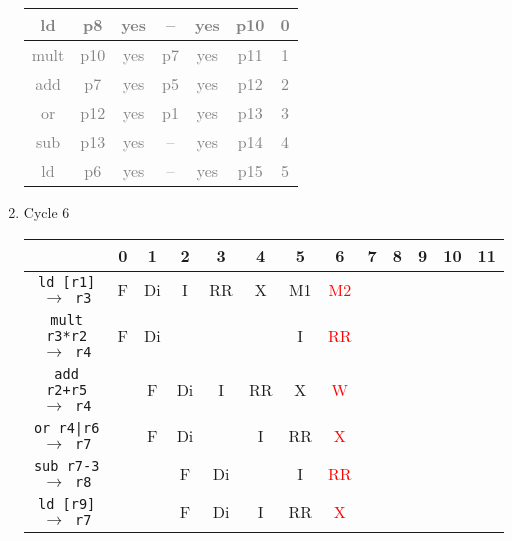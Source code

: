 \documentclass[12pt]{article}
\begin{document}
\begin{enumerate}
\begin{table}[H]
\begin{tabular}{|c|c|c|c|c|c|c|}
					\hline
					\textcolor{gray}{ld} & \textcolor{gray}{p8} & \textcolor{gray}{yes} & \textcolor{gray}{--} & \textcolor{gray}{yes} & \textcolor{gray}{p10} & \textcolor{gray}{0}\\
					\hline
					\textcolor{gray}{mult} & \textcolor{gray}{p10} & \textcolor{gray}{yes} & \textcolor{gray}{p7} & \textcolor{gray}{yes} & \textcolor{gray}{p11} & \textcolor{gray}{1}\\
					\hline
					\textcolor{gray}{add} & \textcolor{gray}{p7} & \textcolor{gray}{yes} & \textcolor{gray}{p5} & \textcolor{gray}{yes} & \textcolor{gray}{p12} & \textcolor{gray}{2}\\
					\hline
					\textcolor{gray}{or} & \textcolor{gray}{p12} & \textcolor{gray}{yes} & \textcolor{gray}{p1} & \textcolor{gray}{yes} & \textcolor{gray}{p13} & \textcolor{gray}{3}\\
					\hline
					\textcolor{gray}{sub} & \textcolor{gray}{p13} & \textcolor{gray}{yes} & \textcolor{gray}{--} & \textcolor{gray}{yes} & \textcolor{gray}{p14} & \textcolor{gray}{4}\\
					\hline
					\textcolor{gray}{ld} & \textcolor{gray}{p6} & \textcolor{gray}{yes} & \textcolor{gray}{--} & \textcolor{gray}{yes} & \textcolor{gray}{p15} & \textcolor{gray}{5}\\
					\hline
				\end{tabular}
			\end{table}
		\item
			Cycle 6
			\begin{table}[H]
				\begin{tabular}{|c|c|c|c|c|c|c|c|c|c|c|c|c|}
					\hline
					 & 0 & 1 & 2 & 3 & 4 & 5 & 6 & 7 & 8 & 9 & 10 & 11\\
					\hline
					\texttt{ld [r1] $\rightarrow$ r3} & F & Di & I & RR & X & M1 & \textcolor{red}{M2} &  &  &  &  &\\
					\hline
					\texttt{mult r3*r2 $\rightarrow$ r4} & F & Di &  &  &  & I & \textcolor{red}{RR} &  &  &  &  &\\
					\hline
					\texttt{add r2+r5 $\rightarrow$ r4} &  & F & Di & I & RR & X & \textcolor{red}{W} &  &  &  &  &\\
					\hline
					\texttt{or r4|r6 $\rightarrow$ r7} &  & F & Di &  & I & RR & \textcolor{red}{X} &  &  &  &  &\\
					\hline
					\texttt{sub r7-3 $\rightarrow$ r8} &  &  & F & Di &  & I & \textcolor{red}{RR} &  &  &  &  &\\
					\hline
					\texttt{ld [r9] $\rightarrow$ r7} &  &  & F & Di & I & RR & \textcolor{red}{X} &  &  &  &  &\\

\end{tabular}
\end{table}
\end{enumerate}
\end{document}
